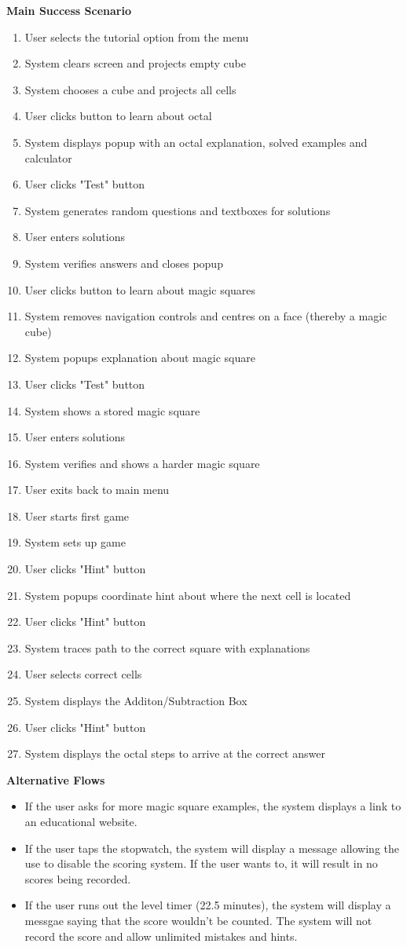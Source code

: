 \documentclass[12pt]{article}
\begin{document}
\textbf{Main Success Scenario}
\begin{enumerate}
\item User selects the tutorial option from the menu
\item System clears screen and projects empty cube
\item System chooses a cube and projects all cells
\item User clicks button to learn about octal
\item System displays popup with an octal explanation, solved examples and calculator
\item User clicks "Test" button
\item System generates random questions and textboxes for solutions
\item User enters solutions
\item System verifies answers and closes popup
\item User clicks button to learn about magic squares
\item System removes navigation controls and centres on a face (thereby a magic cube)
\item System popups explanation about magic square
\item User clicks "Test" button
\item System shows a stored magic square
\item User enters solutions
\item System verifies and shows a harder magic square
\item User exits back to main menu 
\item User starts first game
\item System sets up game
\item User clicks "Hint" button
\item System popups coordinate hint about where the next cell is located
\item User clicks "Hint" button
\item System traces path to the correct square with explanations
\item User selects correct cells
\item System displays the Additon/Subtraction Box
\item User clicks "Hint" button
\item System displays the octal steps to arrive at the correct answer
\end{enumerate}

\textbf{Alternative Flows}
\begin{itemize}
\item If the user asks for more magic square examples, the system displays a link to an educational website.
\item If the user taps the stopwatch, the system will display a message allowing the use to disable the scoring system. If the user wants to, it will result in no scores being recorded.
\item If the user runs out the level timer (22.5 minutes), the system will display a messgae saying that the score wouldn't be counted. The system will not record the score and allow unlimited mistakes and hints.
\end{itemize}
\end{document}
